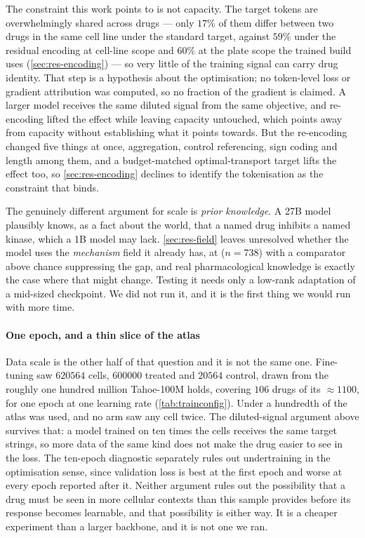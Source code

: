 The constraint this work points to is not capacity. The target tokens are
overwhelmingly shared across drugs --- only $17\%$ of them differ between two
drugs in the same cell line under the standard target, against $59\%$ under the
residual encoding at cell-line scope and $60\%$ at the plate scope the trained
build uses (\cref{sec:res-encoding}) --- so very little of the training signal
can carry drug identity. That step is a hypothesis about the optimisation; no
token-level loss or gradient attribution was computed, so no fraction of the
gradient is claimed. A larger model receives the same diluted signal from the
same objective, and re-encoding lifted the effect while leaving
capacity untouched, which points away from capacity without establishing what it
points towards. But the re-encoding changed five things at once, aggregation,
control referencing, sign coding and length among them, and a budget-matched
optimal-transport target lifts the effect too, so \cref{sec:res-encoding}
declines to identify the tokenisation as the constraint that binds.

The genuinely different argument for scale is \emph{prior knowledge}. A 27B
model plausibly knows, as a fact about the world, that a named drug inhibits a
named kinase, which a 1B model may lack. \cref{sec:res-field} leaves
unresolved whether the model uses the \emph{mechanism} field it already has, at
 ($n = \num{738}$) with a comparator above chance
suppressing the gap, and real pharmacological knowledge is exactly the case
where that might change. Testing it needs only a low-rank adaptation of a
mid-sized checkpoint. We did not run it, and it is the first thing we would run
with more time.

\paragraph{One epoch, and a thin slice of the atlas} Data scale is the other
half of that question and it is not the same one. Fine-tuning saw
$\num{620564}$ cells, $\num{600000}$ treated and $\num{20564}$ control, drawn
from the roughly one hundred million Tahoe-100M holds, covering $106$ drugs of
its $\approx\num{1100}$, for one epoch at one learning rate
(\cref{tab:trainconfig}). Under a hundredth of the atlas was used, and no arm saw
any cell twice. The diluted-signal argument above survives that: a model trained
on ten times the cells receives the same target strings, so more data of the same
kind does not make the drug easier to see in the loss. The ten-epoch diagnostic
separately rules out undertraining in the optimisation sense, since validation
loss is best at the first epoch and worse at every epoch reported after it.
Neither argument rules out the possibility that a drug must be seen in more
cellular contexts than this sample provides before its response becomes
learnable, and that possibility is \notestablished either way. It is a cheaper
experiment than a larger backbone, and it is not one we ran.

